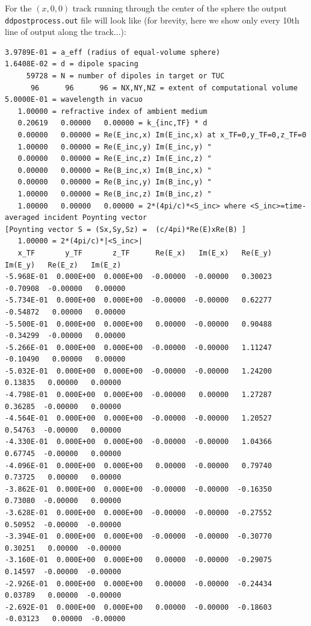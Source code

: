 For the $(x,0,0)$ track running through the center of the sphere
the output {\tt ddpostprocess.out} file will look like (for brevity,
here we show only every 10th line of output along the track...):
{\scriptsize
\begin{verbatim}
3.9789E-01 = a_eff (radius of equal-volume sphere)
1.6408E-02 = d = dipole spacing
     59728 = N = number of dipoles in target or TUC
      96      96      96 = NX,NY,NZ = extent of computational volume
5.0000E-01 = wavelength in vacuo
   1.00000 = refractive index of ambient medium
   0.20619   0.00000   0.00000 = k_{inc,TF} * d
   0.00000   0.00000 = Re(E_inc,x) Im(E_inc,x) at x_TF=0,y_TF=0,z_TF=0
   1.00000   0.00000 = Re(E_inc,y) Im(E_inc,y) "
   0.00000   0.00000 = Re(E_inc,z) Im(E_inc,z) "
   0.00000   0.00000 = Re(B_inc,x) Im(B_inc,x) "
   0.00000   0.00000 = Re(B_inc,y) Im(B_inc,y) "
   1.00000   0.00000 = Re(B_inc,z) Im(B_inc,z) "
   1.00000   0.00000   0.00000 = 2*(4pi/c)*<S_inc> where <S_inc>=time-averaged incident Poynting vector
[Poynting vector S = (Sx,Sy,Sz) =  (c/4pi)*Re(E)xRe(B) ]
   1.00000 = 2*(4pi/c)*|<S_inc>|
   x_TF       y_TF       z_TF      Re(E_x)   Im(E_x)   Re(E_y)   Im(E_y)   Re(E_z)   Im(E_z)
-5.968E-01  0.000E+00  0.000E+00  -0.00000  -0.00000   0.30023  -0.70908  -0.00000   0.00000
-5.734E-01  0.000E+00  0.000E+00  -0.00000  -0.00000   0.62277  -0.54872   0.00000   0.00000
-5.500E-01  0.000E+00  0.000E+00   0.00000  -0.00000   0.90488  -0.34299  -0.00000   0.00000
-5.266E-01  0.000E+00  0.000E+00  -0.00000  -0.00000   1.11247  -0.10490   0.00000   0.00000
-5.032E-01  0.000E+00  0.000E+00  -0.00000  -0.00000   1.24200   0.13835   0.00000   0.00000
-4.798E-01  0.000E+00  0.000E+00  -0.00000   0.00000   1.27287   0.36285  -0.00000   0.00000
-4.564E-01  0.000E+00  0.000E+00  -0.00000  -0.00000   1.20527   0.54763  -0.00000   0.00000
-4.330E-01  0.000E+00  0.000E+00  -0.00000  -0.00000   1.04366   0.67745  -0.00000   0.00000
-4.096E-01  0.000E+00  0.000E+00   0.00000  -0.00000   0.79740   0.73725   0.00000   0.00000
-3.862E-01  0.000E+00  0.000E+00  -0.00000  -0.00000  -0.16350   0.73080  -0.00000   0.00000
-3.628E-01  0.000E+00  0.000E+00  -0.00000  -0.00000  -0.27552   0.50952  -0.00000  -0.00000
-3.394E-01  0.000E+00  0.000E+00  -0.00000  -0.00000  -0.30770   0.30251   0.00000  -0.00000
-3.160E-01  0.000E+00  0.000E+00   0.00000  -0.00000  -0.29075   0.14597  -0.00000  -0.00000
-2.926E-01  0.000E+00  0.000E+00   0.00000  -0.00000  -0.24434   0.03789   0.00000  -0.00000
-2.692E-01  0.000E+00  0.000E+00   0.00000  -0.00000  -0.18603  -0.03123   0.00000  -0.00000

\end{verbatim}}
